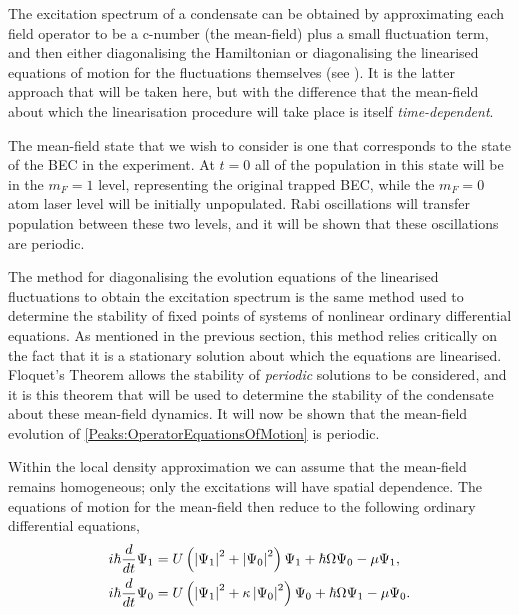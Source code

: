 The excitation spectrum of a condensate can be obtained by approximating each field operator to be a c-number (the mean-field) plus a small fluctuation term, and then either diagonalising the Hamiltonian \cite{Bogoliubov:1947,FetterWalecka} or diagonalising the linearised equations of motion for the fluctuations themselves (see ). It is the latter approach that will be taken here, but with the difference that the mean-field about which the linearisation procedure will take place is itself \emph{time-dependent}.

The mean-field state that we wish to consider is one that corresponds to the state of the BEC in the experiment. At $t=0$ all of the population in this state will be in the $m_F=1$ level, representing the original trapped BEC, while the $m_F=0$ atom laser level will be initially unpopulated. Rabi oscillations will transfer population between these two levels, and it will be shown that these oscillations are periodic.

The method for diagonalising the evolution equations of the linearised fluctuations to obtain the excitation spectrum is the same method used to determine the stability of fixed points of systems of nonlinear ordinary differential equations. As mentioned in the previous section, this method relies critically on the fact that it is a stationary solution about which the equations are linearised. Floquet's Theorem \citep{AppliedNonlinearDynamics} allows the stability of \emph{periodic} solutions to be considered, and it is this theorem that will be used to determine the stability of the condensate about these mean-field dynamics. It will now be shown that the mean-field evolution of \eqref{Peaks:OperatorEquationsOfMotion} is periodic.

Within the local density approximation we can assume that the mean-field remains homogeneous; only the excitations will have spatial dependence. The equations of motion for the mean-field then reduce to the following ordinary differential equations,
\begin{subequations}
    \label{Peaks:MeanFieldEquationsOfMotion}
    \begin{align}
    i \hbar \frac{d }{dt}\Psi_1 &= U\left(\abs{\Psi_1}^2 + \abs{\Psi_0}^2\right)\Psi_1 + \hbar \Omega \Psi_0 - \mu \Psi_1,\\
    i \hbar \frac{d }{dt}\Psi_0 &= U\left(\abs{\Psi_1}^2 + \kappa \abs{\Psi_0}^2\right)\Psi_0 + \hbar \Omega \Psi_1 - \mu \Psi_0.
    \end{align}
\end{subequations}

